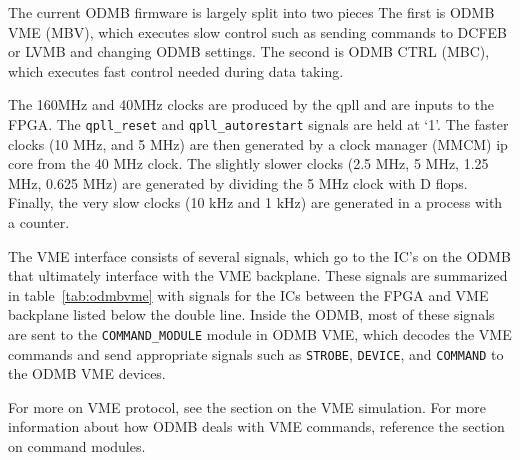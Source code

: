 \documentclass[10pt,a4paper]{article}
\begin{document}
The current ODMB firmware is largely split into two pieces The first is ODMB VME (MBV), which executes slow control such as sending commands to DCFEB or LVMB and changing ODMB settings. The second is ODMB CTRL (MBC), which executes fast control needed during data taking.

The 160MHz and 40MHz clocks are produced by the qpll and are inputs to the FPGA. The \texttt{qpll\_reset} and \texttt{qpll\_autorestart} signals are held at `1'. The faster clocks (10 MHz, and 5 MHz) are then generated by a clock manager (MMCM) ip core from the 40 MHz clock. The slightly slower clocks (2.5 MHz, 5 MHz, 1.25 MHz, 0.625 MHz) are generated by dividing the 5 MHz clock with D flops. Finally, the very slow clocks (10 kHz and 1 kHz) are generated in a process with a counter.

The VME interface consists of several signals, which go to the IC's on the ODMB that ultimately interface with the VME backplane. These signals are summarized in table~\ref{tab:odmbvme} with signals for the ICs between the FPGA and VME backplane listed below the double line. Inside the ODMB, most of these signals are sent to the \texttt{COMMAND\_MODULE} module in ODMB VME, which decodes the VME commands and send appropriate signals such as \texttt{STROBE}, \texttt{DEVICE}, and \texttt{COMMAND} to the ODMB VME devices. 

For more on VME protocol, see the section on the VME simulation. For more information about how ODMB deals with VME commands, reference the section on command modules. 
\end{document}

